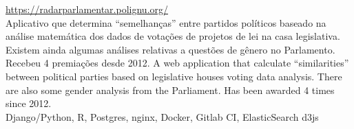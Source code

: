 \documentclass[]{friggeri-cv}
\begin{document}
\textbf{} \hfill \small{\href{https://radarparlamentar.polignu.org/}{https://radarparlamentar.polignu.org/}}\\
\small{%
{Aplicativo que determina ``semelhanças'' entre partidos \nohyphens{políticos} baseado na análise matemática dos dados de votações de projetos de lei na casa \nohyphens{legislativa}. Existem ainda algumas análises relativas a questões de gênero no Parlamento.\\
Recebeu 4 premiações desde 2012.}%
{A web application that calculate ``similarities'' between political parties based on legislative houses voting data analysis. There are also some gender analysis from the Parliament.
Has been awarded 4 times since 2012.}}\\
\maintechs Django/Python, R, Postgres, nginx, Docker, Gitlab CI, ElasticSearch \eand d3js
\end{document}

